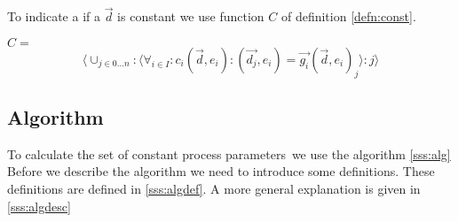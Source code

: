 \documentclass[a4paper,10pt]{article}
\newcommand{\ovr}{\overrightarrow}
\newcommand{\pps}{process parameters}
\begin{document}
 To indicate a if a $\ovr{d}$ is constant we use function $C$ of definition \ref{defn:const}.
\begin{defn}
\label{defn:const}$C =$
\begin{displaymath}
 \langle \cup_{j \in 0 \ldots n}: \langle \forall_{i \in I}:
c_i(\ovr{d},e_i) : (\ovr{d_j},e_i) = \ovr{g_i} (\ovr{d},e_i)_j \rangle :
j \rangle 
\end{displaymath}

\end{defn}

\subsection{Algorithm}
To calculate the set of constant \pps\ we use the algorithm
\ref{sss:alg} Before we describe the algorithm we need to introduce
some definitions. These definitions are defined in \ref{sss:algdef}.
A more general explanation is given in \ref{sss:algdesc}
\end{document}
